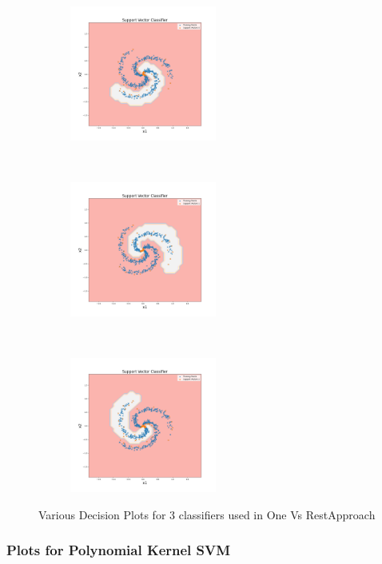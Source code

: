 \begin{figure}[!ht]
    \centering
    \begin{subfigure}[t]{0.3\textwidth}
        \centering
        \includegraphics[height=1.75in]{Dataset_1b/SVM/test1.png}
    \end{subfigure}%
    ~ 
    \begin{subfigure}[t]{0.3\textwidth}
        \centering
        \includegraphics[height=1.75in]{Dataset_1b/SVM/test2.png}
    \end{subfigure}%
    ~
    \begin{subfigure}[t]{0.3\textwidth}
        \centering
        \includegraphics[height=1.75in]{Dataset_1b/SVM/test3.png}
    \end{subfigure}%
    \caption{Various Decision Plots for 3 classifiers used in One Vs RestApproach}
    \label{fig:13}
\end{figure}



\newpage
\subsubsection{Plots for Polynomial Kernel SVM}

